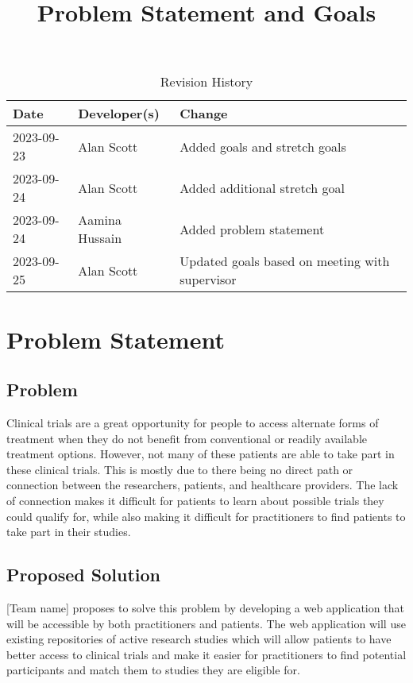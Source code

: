 \documentclass{article}
\title{Problem Statement and Goals\\\progname}
\author{\authname}
\date{}
\begin{document}
\maketitle

\begin{table}[hp]
\caption{Revision History} \label{TblRevisionHistory}
\begin{tabularx}{\textwidth}{llX}
\toprule
\textbf{Date} & \textbf{Developer(s)} & \textbf{Change}\\
\midrule
2023-09-23 & Alan Scott & Added goals and stretch goals\\
2023-09-24 & Alan Scott & Added additional stretch goal \\
2023-09-24 & Aamina Hussain & Added problem statement \\
2023-09-25 & Alan Scott & Updated goals based on meeting with supervisor \\
\bottomrule
\end{tabularx}
\end{table}

\section{Problem Statement}


\subsection{Problem}
Clinical trials are a great opportunity for people to access alternate forms of treatment when they do not benefit 
from conventional or readily available treatment options. However, not many of these patients are able to take part 
in these clinical trials. This is mostly due to there being no direct path or connection between the researchers, patients, 
and healthcare providers. The lack of connection makes it difficult for patients to learn about possible trials they could 
qualify for, while also making it difficult for practitioners to find patients to take part in their studies.

\subsection{Proposed Solution}
[Team name] proposes to solve this problem by developing a web application that will be accessible by both practitioners 
and patients. The web application will use existing repositories of active research studies which will allow patients to 
have better access to clinical trials and make it easier for practitioners to find potential participants and match them to 
studies they are eligible for.
\end{document}
